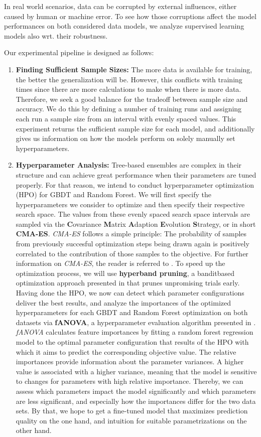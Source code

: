 In real world scenarios, data can be corrupted by external influences, either caused by human or machine error. To see how those corruptions affect the model performances on both considered data models, we analyze supervised learning models also wrt. their robustness. 

Our experimental pipeline is designed as follows:
\begin{enumerate}
	\item \textbf{Finding Sufficient Sample Sizes:} The more data is available for training, the better the generalization will be. However, this conflicts with training times since there are more calculations to make when there is more data. Therefore, we seek a good balance for the tradeoff between sample size and accuracy. We do this by defining a number of training runs and assigning each run a sample size from an interval with evenly spaced values. This experiment returns the sufficient sample size for each model, and additionally gives us information on how the models perform on solely manually set hyperparameters.  
	\item \textbf{Hyperparameter Analysis:} Tree-based ensembles are complex in their structure and can achieve great performance when their parameters are tuned properly. For that reason, we intend to conduct hyperparameter optimization (HPO) for GBDT and Random Forest. We will first specify the hyperparameters we consider to optimize and then specify their respective search space. The values from these evenly spaced search space intervals are sampled via the \textbf{C}ovariance \textbf{M}atrix \textbf{A}daption \textbf{E}volution \textbf{S}trategy, or in short \textbf{CMA-ES}. \textit{CMA-ES} follows a simple principle: The probability of samples from previously succesful optimization steps being drawn again is positively correlated to the contribution of those samples to the objective. For further information on \textit{CMA-ES}, the reader is referred to \cite{hansen2016cma}. To speed up the optimization process, we will use \textbf{hyperband pruning}, a banditbased optimization approach presented in \citet{li2018hyperband} that prunes unpromising trials early. 
	Having done the HPO, we now can detect which parameter configurations deliver the best results, and analyze the importances of the optimized hyperparameters for each GBDT and Random Forest optimization on both datasets via \textbf{fANOVA}, a hyperparameter evaluation algorithm presented in \cite{fANOVA}. \textit{fANOVA} calculates feature importances by fitting a random forest regression model to the optimal parameter configuration that results of the HPO with which it aims to predict the corresponding objective value. The relative importances provide information about the parameter variances. A higher value is associated with a higher variance, meaning that the model is sensitive to changes for parameters with high relative importance. Thereby, we can assess which parameters impact the model significantly and which parameters are less significant, and especially how the importances differ for the two data sets. By that, we hope to get a fine-tuned model that maximizes prediction quality on the one hand, and intuition for suitable parametrizations on the other hand.

\end{enumerate}
